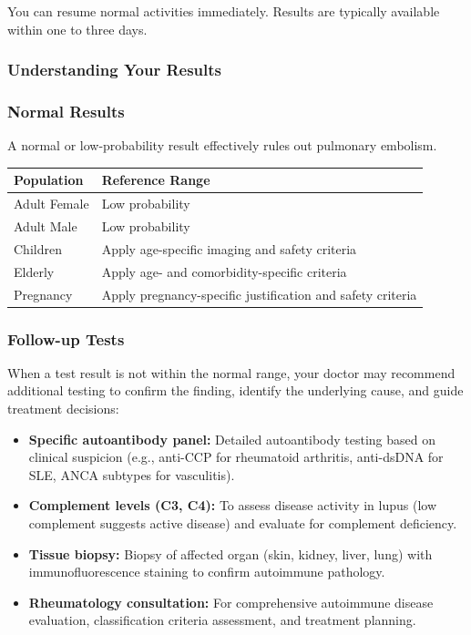 You can resume normal activities immediately. Results are typically available within one to three days.

\subsubsection*{Understanding Your Results}

\subsubsection*{Normal Results}
A normal or low-probability result effectively rules out pulmonary embolism.

\begin{center}
\begin{tabular}{ll}
\toprule
\textbf{Population} & \textbf{Reference Range} \\
\midrule
Adult Female & Low probability \\
Adult Male & Low probability \\
Children & Apply age-specific imaging and safety criteria \\
Elderly & Apply age- and comorbidity-specific criteria \\
Pregnancy & Apply pregnancy-specific justification and safety criteria \\
\bottomrule
\end{tabular}
\end{center}
\subsubsection*{Follow-up Tests}
When a test result is not within the normal range, your doctor may recommend additional testing to confirm the finding, identify the underlying cause, and guide treatment decisions:
\begin{itemize}
    \item \textbf{Specific autoantibody panel:} Detailed autoantibody testing based on clinical suspicion (e.g., anti-CCP for rheumatoid arthritis, anti-dsDNA for SLE, ANCA subtypes for vasculitis).
    \item \textbf{Complement levels (C3, C4):} To assess disease activity in lupus (low complement suggests active disease) and evaluate for complement deficiency.
    \item \textbf{Tissue biopsy:} Biopsy of affected organ (skin, kidney, liver, lung) with immunofluorescence staining to confirm autoimmune pathology.
    \item \textbf{Rheumatology consultation:} For comprehensive autoimmune disease evaluation, classification criteria assessment, and treatment planning.
\end{itemize}
\clearpage
